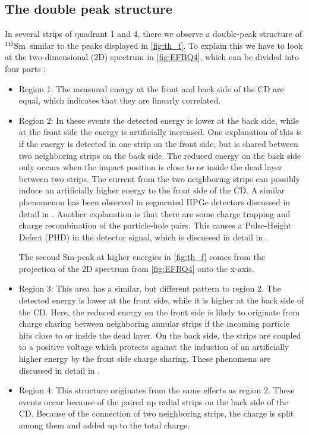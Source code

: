 \documentclass[twoside,english]{uiofysmaster/uiofysmaster}
\newcommand{\Sm}{$^{140}$Sm} %
\let\orgautoref\autoref
\renewcommand{\autoref}
        {%
		 \def\sectionautorefname{Section}%
		 \def\subsectionautorefname{Section}%
		 \def\subsubsectionautorefname{Section}%
		 \def\chapterautorefname{Chapter}%
          \orgautoref}
\begin{document}
\subsection{The double peak structure}\label{ssec:DPS}
In several strips of quadrant 1 and 4, there we observe a double-peak structure of \Sm\ similar to the peaks displayed in \autoref{fig:th_f}. 
To explain this we have to look at the two-dimensional (2D) spectrum in \autoref{fig:EFBQ4}, which can be divided into four parts \cite{Rosiak}:
\begin{itemize}
	\item Region 1: The measured energy at the front and back side of the CD are equal, which indicates that they are linearly correlated.
	\item Region 2: In these events the detected energy is lower at the back side, while at the front side the energy is artificially increased. 
	One explanation of this is if the energy is detected in one strip on the front side, but is shared between two neighboring strips on the back side.
	The reduced energy on the back side only occurs when the impact position is close to or inside the dead layer between two strips. 
	The current from the two neighboring strips can possibly induce an artificially higher energy to the front side of the CD. 
	A similar phenomenon has been observed in segmented HPGe detectors discussed in detail in \cite{Bruyneel2006a, Bruyneel2006b, Bruyneel, Descovich2005, Abt2017}.	
	Another explanation is that there are some charge trapping and charge recombination of the particle-hole pairs. 
	This causes a Pulse-Height Defect (PHD) in the detector signal, which is discussed in detail in \cite{Miller1962, Wilkins1971}.
	
	The second Sm-peak at higher energies in \autoref{fig:th_f} comes from the projection of the 2D spectrum from \autoref{fig:EFBQ4} onto the x-axis.
	\item Region 3: This area has a similar, but different pattern to region 2. 
	The detected energy is lower at the front side, while it is higher at the back side of the CD. 
	Here, the reduced energy on the front side is likely to originate from charge sharing between neighboring annular strips if the incoming particle hits close to or inside the dead layer. 
	 On the back side, the strips are coupled to a positive voltage which protects against the induction of an artificially higher energy by the front side charge sharing. 
	These phenomena are discussed in detail in \cite{Grassi2014, Kramberger2002}.
	\item Region 4: This structure originates from the same effects as region 2.
	These events occur because of the paired up radial strips on the back side of the CD.  
	Because of the connection of two neighboring strips, the charge is split among them and added up to the total charge.
\end{itemize}
\end{document}
